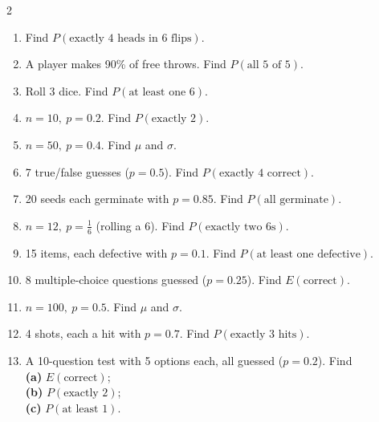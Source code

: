 \documentclass[11pt]{article}
\begin{document}
\clearpage
{}

\begin{recapbox}
\begin{multicols}{2}
\small
\begin{enumerate}[leftmargin=*,itemsep=3pt]
  \item Find $P(\text{exactly 4 heads in 6 flips})$.
  \item A player makes 90\% of free throws. Find $P(\text{all 5 of 5})$.
  \item Roll 3 dice. Find $P(\text{at least one 6})$.
  \item $n=10,\ p=0.2$. Find $P(\text{exactly 2})$.
  \item $n=50,\ p=0.4$. Find $\mu$ and $\sigma$.
  \item 7 true/false guesses ($p=0.5$). Find $P(\text{exactly 4 correct})$.
  \item 20 seeds each germinate with $p=0.85$. Find $P(\text{all germinate})$.
  \item $n=12,\ p=\tfrac16$ (rolling a 6). Find $P(\text{exactly two 6s})$.
  \item 15 items, each defective with $p=0.1$. Find $P(\text{at least one defective})$.
  \item 8 multiple-choice questions guessed ($p=0.25$). Find $E(\text{correct})$.
  \item $n=100,\ p=0.5$. Find $\mu$ and $\sigma$.
  \item 4 shots, each a hit with $p=0.7$. Find $P(\text{exactly 3 hits})$.
  \item A 10-question test with 5 options each, all guessed ($p=0.2$). Find \\ \textbf{(a)} $E(\text{correct})$; \\ \textbf{(b)} $P(\text{exactly 2})$; \\ \textbf{(c)} $P(\text{at least 1})$.
\end{enumerate}
\end{multicols}
\end{recapbox}
\end{document}
